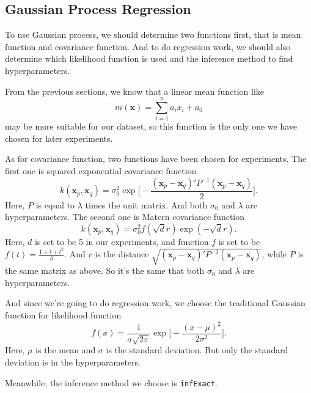 \documentclass[a4paper]{article}
\newcommand{\bfx}{\mathbf{x}}
\begin{document}
\subsection{Gaussian Process Regression}
To use Gaussian process, we should determine two functions first, that is mean function and covariance function. And to do regression work, we should also determine which likelihood function is used and the inference method to find hyperparameters.

From the previous sections, we know that a linear mean function like
\begin{equation}
m(\bfx)=\sum_{i=1}^n a_ix_i + a_0
\end{equation}
may be more suitable for our dataset, so this function is the only one we have chosen for later experiments.

As for covariance function, two functions have been chosen for experiments. The first one is squared exponential covariance function
\begin{equation}
k(\bfx_p,\bfx_q)=\sigma_0^2\exp\Big[-\frac{(\bfx_p-\bfx_q)'P^{-1}(\bfx_p-\bfx_q)}{2}\Big].
\end{equation}
Here, $P$ is equal to $\lambda$ times the unit matrix. And both $\sigma_0$ and $\lambda$ are hyperparameters. The second one is Matern covariance function
\begin{equation}
k(\bfx_p,\bfx_q)=\sigma_0^2f(\sqrt{d}r)\exp(-\sqrt{d}r).
\end{equation}
Here, $d$ is set to be 5 in our experiments, and function $f$ is set to be $f(t)=\frac{1+t+t^2}{3}$. And $r$ is the distance $\sqrt{(\bfx_p-\bfx_q)'P^{-1}(\bfx_p-\bfx_q)}$, while $P$ is the same matrix as above. So it's the same that both $\sigma_0$ and $\lambda$ are hyperparameters.

And since we're going to do regression work, we choose the traditional Gaussian function for likelihood function
\begin{equation}
f(x)=\frac{1}{\sigma\sqrt{2\pi}} \exp\Big[ -\frac{(x-\mu)^2}{2\sigma^2} \Big].
\end{equation}
Here, $\mu$ is the mean and $\sigma$ is the standard deviation. But only the standard deviation is in the hyperparameters.

Meanwhile, the inference method we choose is \texttt{infExact}.
\end{document}

